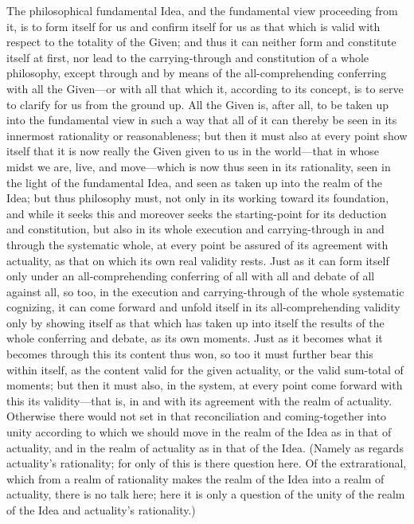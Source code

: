 \documentclass[12pt,a4paper]{book}
\begin{document}
{\small The philosophical fundamental Idea, and the fundamental view proceeding from
it, is to form itself for us and confirm itself for us as that which is valid with
respect to the totality of the Given; and thus it can neither form and constitute
itself at first, nor lead to the carrying-through and constitution of a whole
philosophy, except through and by means of the all-comprehending conferring with all
the Given---or with all that which it, according to its concept, is to serve to clarify
for us from the ground up. All the Given is, after all, to be taken up into the
fundamental view in such a way that all of it can thereby be seen in its innermost
rationality or reasonableness; but then it must also at every point show itself that
it is now really the Given given to us in the world---that in whose midst we are, live,
and move---which is now thus seen in its rationality, seen in the light of the
fundamental Idea, and seen as taken up into the realm of the Idea; but thus philosophy
must, not only in its working toward its foundation, and while it seeks this and
moreover seeks the starting-point for its deduction and constitution, but also in its
whole execution and carrying-through in and through the systematic whole, at every
point be assured of its agreement with actuality, as that on which its own real
validity rests. Just as it can form itself only under an all-comprehending conferring
of all with all and debate of all against all, so too, in the execution and
carrying-through of the whole systematic cognizing, it can come forward and unfold
itself in its all-comprehending validity only by showing itself as that which has
taken up into itself the results of the whole conferring and debate, as its own
moments. Just as it becomes what it becomes through this its content thus won, so too
it must further bear this within itself, as the content valid for the given actuality,
or the valid sum-total of moments; but then it must also, in the system, at every
point come forward with this its validity---that is, in and with its agreement with
the realm of actuality. Otherwise there would not set in that reconciliation and
coming-together into unity according to which we should move in the realm of the Idea
as in that of actuality, and in the realm of actuality as in that of the Idea. (Namely
as regards actuality's rationality; for only of this is there question here. Of the
extrarational, which from a realm of rationality makes the realm of the Idea into a
realm of actuality, there is no talk here; here it is only a question of the unity of
the realm of the Idea and actuality's rationality.)\par}
\end{document}
